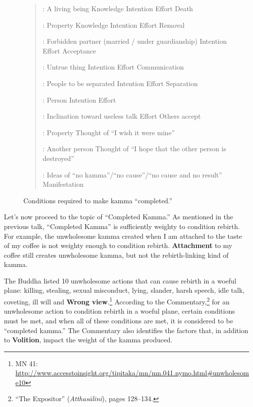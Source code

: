\begin{figure}[H]

\begin{quote}

:  A living being  Knowledge  Intention  Effort  Death

:  Property  Knowledge  Intention  Effort  Removal

:  Forbidden partner (married / under guardianship)  Intention  Effort  Acceptance

:  Untrue thing  Intention  Effort  Communication

:  People to be separated  Intention  Effort  Separation

:  Person  Intention  Effort

:  Inclination toward useless talk  Effort  Others accept 

:  Property  Thought of “I wish it were mine”

:  Another person  Thought of “I hope that the other person is destroyed”

:  Ideas of “no kamma”/“no cause”/“no cause and no result”  Manifestation

\end{quote}

\caption{Conditions required to make kamma “completed.”}
\label{fig:Completed}
\end{figure}

Let’s now proceed to the topic of “Completed Kamma.” As mentioned in the previous talk, “Completed Kamma” is sufficiently weighty to condition rebirth. For example, the unwholesome kamma created when I am attached to the taste of my coffee is not weighty enough to condition rebirth. \textbf{Attachment} to my coffee still creates unwholesome kamma, but not the rebirth-linking kind of kamma.

The Buddha listed 10 unwholesome actions that can cause rebirth in a woeful plane: killing, stealing, sexual misconduct, lying, slander, harsh speech, idle talk, coveting, ill will and \textbf{Wrong view}.\footnote{MN 41: \url{http://www.accesstoinsight.org/tipitaka/mn/mn.041.nymo.html\#unwholesome10}} According to the Commentary,\footnote{“The Expositor” (\textit{Atthasālinī}), pages 128--134.} for an unwholesome action to condition rebirth in a woeful plane, certain conditions must be met, and when all of these conditions are met, it is considered to be “completed kamma.” The Commentary also identifies the factors that, in addition to \textbf{Volition}, impact the weight of the kamma produced. 

